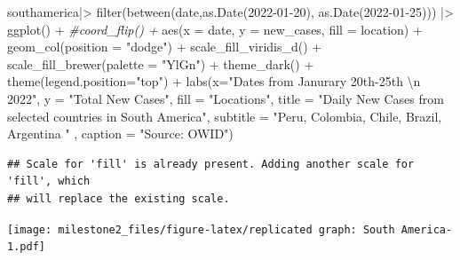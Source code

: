 \documentclass[
]{article}
\newenvironment{Shaded}{\begin{snugshade}}{\end{snugshade}}
\newcommand{\AttributeTok}[1]{\textcolor[rgb]{0.77,0.63,0.00}{#1}}
\newcommand{\CommentTok}[1]{\textcolor[rgb]{0.56,0.35,0.01}{\textit{#1}}}
\newcommand{\FunctionTok}[1]{\textcolor[rgb]{0.00,0.00,0.00}{#1}}
\newcommand{\NormalTok}[1]{#1}
\newcommand{\SpecialCharTok}[1]{\textcolor[rgb]{0.00,0.00,0.00}{#1}}
\newcommand{\StringTok}[1]{\textcolor[rgb]{0.31,0.60,0.02}{#1}}
\begin{document}
\begin{Shaded}
\begin{Highlighting}[]
\NormalTok{southamerica}\SpecialCharTok{|\textgreater{}}
  \FunctionTok{filter}\NormalTok{(}\FunctionTok{between}\NormalTok{(date,}\FunctionTok{as.Date}\NormalTok{(}\StringTok{\textquotesingle{}2022{-}01{-}20\textquotesingle{}}\NormalTok{), }\FunctionTok{as.Date}\NormalTok{(}\StringTok{\textquotesingle{}2022{-}01{-}25\textquotesingle{}}\NormalTok{))) }\SpecialCharTok{|\textgreater{}}
  \FunctionTok{ggplot}\NormalTok{() }\SpecialCharTok{+}
  \CommentTok{\#coord\_flip() +}
  \FunctionTok{aes}\NormalTok{(}\AttributeTok{x =}\NormalTok{ date, }\AttributeTok{y =}\NormalTok{ new\_cases, }\AttributeTok{fill =}\NormalTok{ location) }\SpecialCharTok{+}
  \FunctionTok{geom\_col}\NormalTok{(}\AttributeTok{position =} \StringTok{"dodge"}\NormalTok{) }\SpecialCharTok{+}
  \FunctionTok{scale\_fill\_viridis\_d}\NormalTok{() }\SpecialCharTok{+}
  \FunctionTok{scale\_fill\_brewer}\NormalTok{(}\AttributeTok{palette =} \StringTok{"YlGn"}\NormalTok{) }\SpecialCharTok{+}
  \FunctionTok{theme\_dark}\NormalTok{() }\SpecialCharTok{+}
  \FunctionTok{theme}\NormalTok{(}\AttributeTok{legend.position=}\StringTok{"top"}\NormalTok{) }\SpecialCharTok{+}
   \FunctionTok{labs}\NormalTok{(}\AttributeTok{x=}\StringTok{"Dates from Janurary 20th{-}25th }\SpecialCharTok{\textbackslash{}n}\StringTok{ 2022"}\NormalTok{,}
       \AttributeTok{y =} \StringTok{"Total New Cases"}\NormalTok{,}
       \AttributeTok{fill =} \StringTok{"Locations"}\NormalTok{,}
       \AttributeTok{title =} \StringTok{"Daily New Cases from selected countries in South America"}\NormalTok{,}
       \AttributeTok{subtitle =} \StringTok{"Peru, Colombia, Chile, Brazil, Argentina "}\NormalTok{ ,}
       \AttributeTok{caption =} \StringTok{"Source: OWID"}\NormalTok{)}
\end{Highlighting}
\end{Shaded}

\begin{verbatim}
## Scale for 'fill' is already present. Adding another scale for 'fill', which
## will replace the existing scale.
\end{verbatim}

\texttt{[image: milestone2\_files/figure-latex/replicated graph: South America-1.pdf]}
\end{document}
